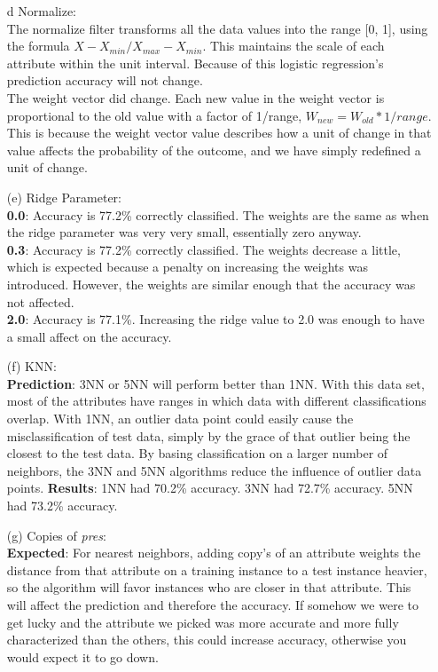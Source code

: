 \documentclass[12pt]{article}
\begin{document}
\begin{enumerate}
\begin{enumerate}
  	\item[{d}] Normalize: \\
	  	The normalize filter transforms all the data values into the range [0, 1], using the formula $X - X_{min} / X_{max} - X_{min}$. This maintains the scale of each attribute within the unit interval.  Because of this logistic regression's prediction accuracy will not change.  \\
		The weight vector did change. Each new value in the weight vector is proportional to the old value with a factor of 1/range, $W_{new} = W_{old} * 1/range$. This is because the weight vector value describes how a unit of change in that value affects the probability of the outcome, and we have simply redefined a unit of change. \\	 
	 \item[(e)] Ridge Parameter: \\
	 	  		\textbf{0.0}: Accuracy is 77.2\% correctly classified. The weights are the same as when the ridge parameter was very very small, essentially zero anyway. \\
	 	  		\textbf{0.3}: Accuracy is 77.2\% correctly classified. The weights decrease a little, which is expected because a penalty on increasing the weights was introduced. However, the weights are similar enough that the accuracy was not affected. \\
	 	  		\textbf{2.0}: Accuracy is 77.1\%. Increasing the ridge value to 2.0 was enough to have a small affect on the accuracy. 
	 \item[(f)] KNN: \\
	 			\textbf{Prediction}: 3NN or 5NN will perform better than 1NN. With this data set, most of the attributes have ranges in which data with different classifications overlap. With 1NN, an outlier data point could easily cause the misclassification of test data, simply by the grace of that outlier being the closest to the test data. By basing classification on a larger number of neighbors, the 3NN and 5NN algorithms reduce the influence of outlier data points.  
	 			\textbf{Results}: 1NN had 70.2\% accuracy. 3NN had 72.7\% accuracy. 5NN had 73.2\% accuracy.  \\
	 \item[(g)] Copies of \textit{pres}: \\
	 	\textbf{Expected}:  For nearest neighbors, adding copy's of an attribute weights the distance from that attribute on a training instance to a test instance heavier, so the algorithm will favor instances who are closer in that attribute. This will affect the prediction and therefore the accuracy. If somehow we were to get lucky and the attribute we picked was more accurate and more fully characterized than the others, this could increase accuracy, otherwise you would expect it to go down.\\

\end{enumerate}
\end{enumerate}
\end{document}
